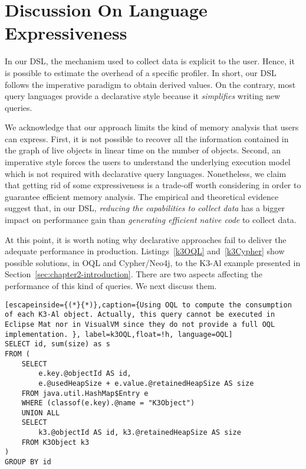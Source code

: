 \section{Discussion On Language Expressiveness}\label{sec:expressiveness}

In our DSL, the mechanism used to collect data is explicit to the user.
Hence, it is possible to estimate the overhead of a specific profiler.
In short, our DSL follows the imperative paradigm to obtain derived values.
On the contrary, most query languages provide a declarative style because it \textit{simplifies} writing new queries.

We acknowledge that our approach limits the kind of memory analysis that users can express.
First, it is not possible to recover all the information contained in the graph of live objects in linear time on the number of objects.
Second, an imperative style forces the users to understand the underlying execution model which is not required with declarative query languages.
Nonetheless, we claim that getting rid of some expressiveness is a trade-off worth considering in order to guarantee efficient memory analysis.
The empirical and theoretical evidence suggest that, in our DSL, \textit{reducing the capabilities to collect data} has a bigger impact on performance gain than \textit{generating efficient native code} to collect data.

At this point, it is worth noting why declarative approaches fail to deliver the adequate performance in production.
Listings~\ref{k3OQL} and~\ref{k3Cypher} show possible solutions, in OQL and Cypher/Neo4j, to the K3-Al example presented in Section~\ref{sec:chapter2-introduction}.
There are two aspects affecting the performance of this kind of queries.
We next discuss them.

\begin{lstlisting}[escapeinside={(*}{*)},caption={Using OQL to compute the consumption of each K3-Al object. Actually, this query cannot be executed in Eclipse Mat nor in VisualVM since they do not provide a full OQL implementation. }, label=k3OQL,float=!h, language=OQL]
SELECT id, sum(size) as s
FROM (
	SELECT
		e.key.@objectId AS id, 
		e.@usedHeapSize + e.value.@retainedHeapSize AS size
	FROM java.util.HashMap$Entry e
	WHERE (classof(e.key).@name = "K3Object")
	UNION ALL
	SELECT 
		k3.@objectId AS id, k3.@retainedHeapSize AS size 
	FROM K3Object k3
)
GROUP BY id
\end{lstlisting}

